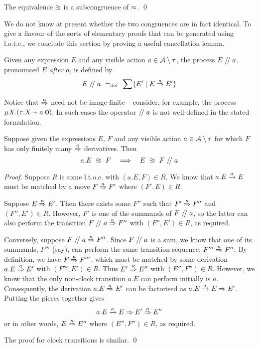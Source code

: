\documentclass[orivec,envcountsame]{llncs}
\begin{document}
\begin{lemma}
The equivalence $\approxeq$ is a subcongruence of $\approx$. \qed
\end{lemma}

We do not know at present whether the two congruences are in fact
identical. To give a flavour of the sorts of elementary proofs that can
be generated using l.o.t.c., we conclude this section by proving a
useful cancellation lemma.

\begin{definition}
Given any expression $E$ and any visible action $a \in
\text{$\mathcal{A}$}\setminus\tau$, the process $E\mathrel{/\!/} a$, pronounced
\emph{$E$ after $a$}, is defined by
\[
    E\mathrel{/\!/} a \mathrel{~=_\mathrm{def}~} \sum \{ E' \mid E \stackrel{a}{\Rightarrow} E' \}
\]
\end{definition}

Notice that $\stackrel{a}{\Rightarrow}$ need not be image-finite -- consider, for
example, the process $\mu X .(\tau. X + a.\textbf{0})$. In such cases
the operator $\mathrel{/\!/} a$ is not well-defined in the stated formulation.

\begin{theorem}
\label{thm:cancellation}

Suppose given the expressions $E$, $F$ and any visible action
$a \in \text{$\mathcal{A}$}\setminus\tau$ for which $F$ has only finitely many
$\stackrel{a}{\Rightarrow}$ derivatives. Then
\[
    a. E ~\approxeq~ F 
    \quad\Longrightarrow\quad 
    E ~\approxeq~ F\mathrel{/\!/} a
\]
\end{theorem}
\begin{proof}

Suppose $R$ is some l.t.o.e. with $(a. E,F) \in R$. We know
that $a. E \xrightarrow{a} E$ must be matched by a move $F
\stackrel{a}{\Rightarrow} F'$ where $(F', E) \in R$.

Suppose $E \stackrel{\kappa}{\Rightarrow} E'$. Then there exists some $F''$
such that $F' \stackrel{\kappa}{\Rightarrow} F''$ and $(F'',E') \in
R$. However, $F'$ is one of the summands of $F\mathrel{/\!/} a$, so
the latter can also perform the transition $F\mathrel{/\!/} a
\stackrel{\kappa}{\Rightarrow} F''$ with $(F'',E') \in R$, as required.

Conversely, suppose $F\mathrel{/\!/} a \stackrel{\kappa}{\Rightarrow} F''$. Since
$F\mathrel{/\!/} a$ is a sum, we know that one of its summands,
$F'''$ (say), can perform the same transition sequence: $F'''
\stackrel{\kappa}{\Rightarrow} F''$. By definition, we have $F \stackrel{a}{\Rightarrow}
F'''$, which must be matched by some derivation $a. E
\stackrel{a}{\Rightarrow} E'$ with $(F''', E') \in R$. Thus $E'
\stackrel{\kappa}{\Rightarrow} E''$ with $(E'',F'') \in R$. However, we know
that the only non-clock transition $a.E$ can perform initially is
$a$. Consequently, the derivation $a.E \stackrel{a}{\Rightarrow} E'$ can be
factorised as $a.E \xrightarrow{a} E \mathrel{\Rightarrow} E'$. Putting the
pieces together gives
\[
    a. E \xrightarrow{a} E \mathrel{\Rightarrow} E' \stackrel{\kappa}{\Rightarrow} E''
\]
or in other words, $E\stackrel{\kappa}{\Rightarrow} E''$ where
$(E'',F'') \in R$, as required.

The proof for clock transitions is similar.
\qed \end{proof}
\end{document}
